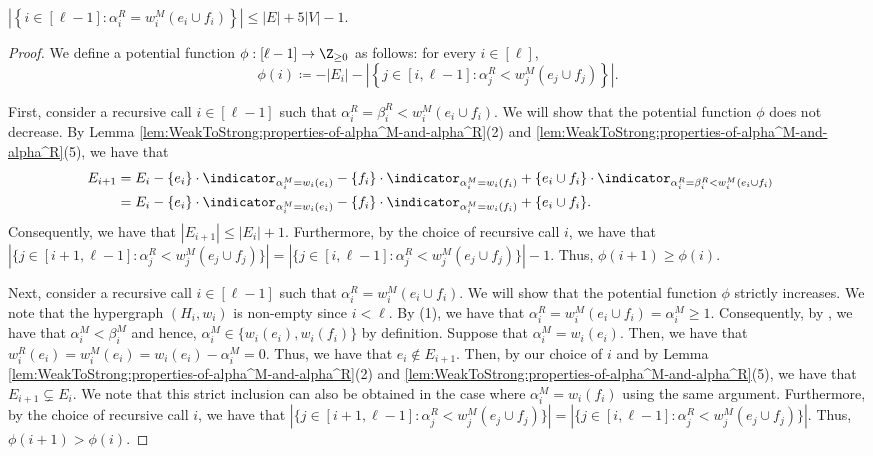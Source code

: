 \begin{claim}\label{claim:WeakToStrong:hyperedge-support-size:alpha^R<weight-of-added-hyperedge}
    $\left|\left\{i \in [\ell - 1] : \alpha_i^R = w_i^M(e_i \cup f_i)\right\}\right| \leq |E| + 5|V| - 1$. %
\end{claim}
\begin{proof}
    We define a potential function $\phi:[\ell - 1] \rightarrow \Z_{\geq 0}$ as follows: for every $i \in [\ell]$,
    $$\phi(i) \coloneqq  -|E_i| - \left|\left\{j \in [i,\ell - 1] : \alpha_j^R < w_j^M(e_j\cup f_j)\right\}\right|.$$
    
    First, consider a recursive call $i \in [\ell - 1]$ such that $\alpha_i^R = \beta_i^R < w_i^M(e_i \cup f_i)$. We will show that the potential function $\phi$ does not decrease. By Lemma \ref{lem:WeakToStrong:properties-of-alpha^M-and-alpha^R}(2) and \ref{lem:WeakToStrong:properties-of-alpha^M-and-alpha^R}(5), we have that 
    \begin{align*}
       E_{i+1} & = E_i - \{e_i\}\cdot \indicator_{\alpha_i^M = w_i(e_i)} - \{f_i\}\cdot \indicator_{\alpha_i^M = w_i(f_i)} + \{e_i\cup f_i\}\cdot \indicator_{\alpha_i^R = \beta_i^R < w_i^M(e_i \cup f_i)}&\\
        &= E_i - \{e_i\}\cdot \indicator_{\alpha_i^M = w_i(e_i)} - \{f_i\}\cdot \indicator_{\alpha_i^M = w_i(f_i)} + \{e_i\cup f_i\}.&
    \end{align*}
Consequently, 
    we have that $|E_{i+1}| \leq |E_i| + 1$. Furthermore, by the choice of recursive call $i$, we have that $\left|\{j \in [i+1, \ell - 1] : \alpha_j^R < w_j^M(e_j\cup f_j)\}\right| = \left|\{j \in [i, \ell - 1] : \alpha_j^R < w_j^M(e_j\cup f_j)\}\right| - 1$. Thus, $\phi(i+1) \geq \phi(i)$.
    
     Next, consider a recursive call $i \in [\ell - 1]$ such that $\alpha_i^R = w_i^M(e_i \cup f_i)$. We will show that the potential function $\phi$ strictly increases. We note that the hypergraph $(H_i, w_i)$ is non-empty since $i < \ell$.  
     By (1), we have that $\alpha_i^R = w_i^M(e_i \cup f_i) = \alpha_i^M \geq 1$. 
     Consequently, by  , we have that $\alpha_i^M  < \beta_i^M$ and hence, $\alpha_i^M \in \{w_i(e_i), w_i(f_i)\}$ by definition. 
     Suppose that $\alpha_i^M = w_i(e_i)$. 
     Then, we have that $w^R_i(e_i) = w^M_i(e_i) = w_i(e_i) - \alpha_{i}^M = 0$. 
     Thus, we have that $e_i \not \in E_{i+1}$. 
     Then, by our choice of $i$ and by Lemma \ref{lem:WeakToStrong:properties-of-alpha^M-and-alpha^R}(2) and \ref{lem:WeakToStrong:properties-of-alpha^M-and-alpha^R}(5), we have that $E_{i+1} \subsetneq E_i$. 
     We note that this strict inclusion can also be obtained in the case where $\alpha_i^M = w_i(f_i)$ using the same argument. Furthermore, by the choice of recursive call $i$, we have that $\left|\{j \in [i+1, \ell - 1] : \alpha_j^R < w_j^M(e_j\cup f_j)\}\right| = \left|\{j \in [i, \ell - 1] : \alpha_j^R < w_j^M(e_j\cup f_j)\}\right|$.
     Thus, $\phi(i+1) > \phi(i)$.


\end{proof}
